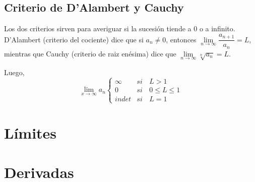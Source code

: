 \documentclass{article}
\begin{document}
\subsection{Criterio de D'Alambert y Cauchy}
Los dos criterios sirven para averiguar si la sucesión tiende a $0$ o a infinito.
D'Alambert (criterio del cociente) dice que si $a_n \neq 0$, entonces $\lim \limits_{n \to \infty} \dfrac{a_{n+1}}{a_n} = L$, mientras que Cauchy (criterio de raiz enésima) dice que $\displaystyle \lim \limits_{n \to \infty} \sqrt[n]{a_n} = L$.

Luego, 
\[
\lim \limits_{x \to \infty} a_n \left\{
\begin{array}{lcr}
    \infty & si & \,L>1 \\
     0 & si & \,0 \leq L \leq 1 \\
     indet & si & \,L=1
\end{array}
\right.
\]

\section{Límites}


\section{Derivadas}
\end{document}
